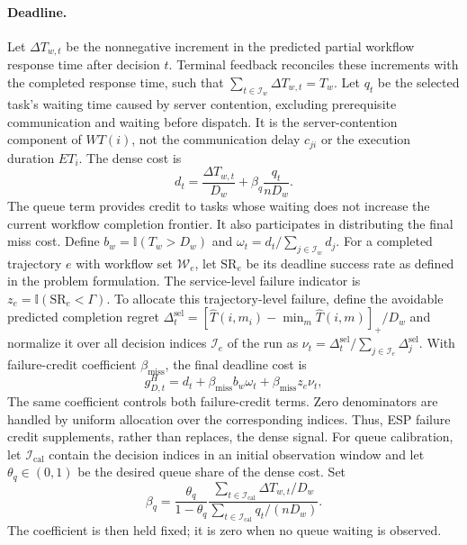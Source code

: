 \documentclass[10pt,twocolumn]{article}
\begin{document}
\paragraph{Deadline.}
Let $\Delta T_{w,t}$ be the nonnegative increment in the predicted
partial workflow response time after decision $t$. Terminal feedback
reconciles these increments with the completed response time, such that
$\sum_{t\in\mathcal I_w}\Delta T_{w,t}=T_w$.
Let $q_t$ be the selected task's waiting time caused by server contention,
excluding prerequisite communication and waiting before dispatch.
It is the server-contention component of $WT(i)$, not the
communication delay $c_{ji}$ or the execution duration $ET_i$.
The dense cost is
\begin{equation}
 d_t=\frac{\Delta T_{w,t}}{D_w}
 +\beta_q\frac{q_t}{nD_w}.
 \label{eq:method_dense_cost}
\end{equation}
The queue term provides credit to tasks whose waiting does not increase
the current workflow completion frontier. It also participates in
distributing the final miss cost. Define
$b_w=\mathbb{I}(T_w>D_w)$ and
$\omega_t=d_t/\sum_{j\in\mathcal I_w}d_j$.
For a completed trajectory $e$ with workflow set $\mathcal W_e$, let
$\mathrm{SR}_e$ be its deadline success rate as defined in the problem
formulation. The service-level failure indicator is
$z_e=\mathbb{I}(\mathrm{SR}_e<\Gamma)$.
To allocate this trajectory-level failure, define the avoidable
predicted completion regret
$\Delta_t^{\mathrm{sel}}=[\widehat T(i,m_i)-\min_m\widehat T(i,m)]_+/D_w$
and normalize it
over all decision indices $\mathcal I_e$ of the run as
$\nu_t=\Delta_t^{\mathrm{sel}}/\sum_{j\in\mathcal I_e}\Delta_j^{\mathrm{sel}}$.
With failure-credit coefficient $\beta_{\mathrm{miss}}$, the final deadline cost is
\begin{equation}
 g_{D,t}^H=d_t+\beta_{\mathrm{miss}} b_w\omega_t
 +\beta_{\mathrm{miss}} z_e\nu_t,
 \label{eq:method_high_deadline}
\end{equation}
The same coefficient controls both failure-credit terms. Zero denominators
are handled by uniform allocation over the corresponding indices.
Thus, ESP failure credit supplements, rather than replaces, the dense
signal. For queue calibration, let $\mathcal I_{\mathrm{cal}}$ contain
the decision indices in an initial observation window and let
$\theta_q\in(0,1)$ be the desired queue share of the dense cost. Set
\begin{equation}
 \beta_q=\frac{\theta_q}{1-\theta_q}
 \frac{\sum_{t\in\mathcal I_{\mathrm{cal}}}\Delta T_{w,t}/D_w}
 {\sum_{t\in\mathcal I_{\mathrm{cal}}}q_t/(nD_w)}.
 \label{eq:method_queue_calibration}
\end{equation}
The coefficient is then held fixed;
it is zero when no queue waiting is observed.
\end{document}
